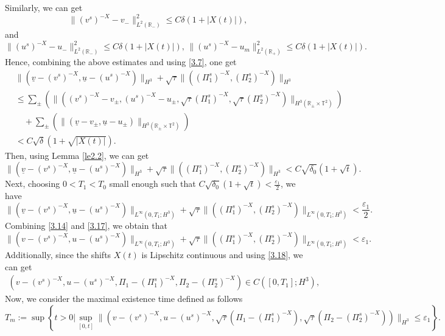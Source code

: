 \documentclass[10pt,reqno]{amsart}
\numberwithin{equation}{section}
\begin{document}
Similarly, we can get
$$
\|(v^s)^{-X}-v_-\|_{L^2(\mathbb{R}_-)}^2\le C\delta(1+|X(t)|),
$$
and
$$
 \|(u^s)^{-X}-u_-\|_{L^2(\mathbb{R}_-)}^2\le C\delta(1+|X(t)|), \, \|(u^s)^{-X}-u_m\|_{L^2(\mathbb{R}_+)}^2\le C\delta(1+|X(t)|).
$$
Hence, combining the above estimates and using \eqref{3.7}, one get
\begin{align*}
&\|(\underline{v}-(v^s)^{-X},\underline{u}-(u^s)^{-X})\|_{H^3}
+\sqrt{\tau}\|((\Pi_1^s)^{-X}, (\Pi_2^s)^{-X})\|_{H^3}\\
&\le
\sum\limits_{\pm}\left(\|((v^s)^{-X}-v_{\pm},(u^s)^{-X}-u_{\pm},
\sqrt{\tau}(\Pi_1^s)^{-X}, \sqrt{\tau}(\Pi_2^s)^{-X})\|_{H^3(\mathbb{R}_{\pm}\times\mathbb{T}^2)}\right)
\\
&\quad+\sum\limits_{\pm}\left(\|(\underline{v}-v_{\pm},\underline{u}-u_{\pm})\|
_{H^3(\mathbb{R}_{\pm}\times\mathbb{T}^2)}\right)\\
&<C\sqrt{\delta}(1+\sqrt{|X(t)|}).
\end{align*}
Then, using Lemma \ref{le2.2}, we can get
\begin{equation}\nonumber
\|(\underline{v}-(v^s)^{-X},\underline{u}-(u^s)^{-X})\|_{H^3}
+\sqrt{\tau}\|((\Pi_1^s)^{-X}, (\Pi_2^s)^{-X})\|_{H^3}
<C\sqrt{\delta_0}(1+\sqrt{t}).
\end{equation}
Next, choosing $0<T_1<T_0$ small enough such that $C\sqrt{\delta_0}(1+\sqrt{t})<\frac{\varepsilon_1}{2}$, we have
\begin{equation}\label{3.17}
\|(\underline{v}-(v^s)^{-X},\underline{u}-(u^s)^{-X})\|_{L^\infty(0, T_1; H^3)}
+\sqrt{\tau}\|((\Pi_1^s)^{-X}, (\Pi_2^s)^{-X})\|_{L^\infty(0, T_1; H^3)}<\frac{\varepsilon_1}{2}.
\end{equation}
Combining \eqref{3.14} and \eqref{3.17}, we obtain that
\begin{equation}\label{3.18}
\|(v-(v^s)^{-X},u-(u^s)^{-X})\|_{L^\infty(0, T_1; H^3)}
+\sqrt{\tau}\|((\Pi_1^s)^{-X}, (\Pi_2^s)^{-X})\|_{L^\infty(0, T_1; H^3)}
<\varepsilon_1.
\end{equation}
Additionally, since the shifts $X(t)$ is Lipschitz continuous and using \eqref{3.18}, we can get
\begin{equation}\nonumber
\begin{aligned}
(v-(v^s)^{-X}, u- (u^s)^{-X}, \Pi_1- (\Pi_1^s)^{-X}, \Pi_2- (\Pi_2^s)^{-X})\in C([0,T_1];H^3),
\end{aligned}
\end{equation}
Now, we consider the maximal existence time defined as follows
\[
T_m:=\sup\left\{t>0\Big|\sup\limits_{[0, t]}
 \|(v-(v^s)^{-X}, u-(u^s)^{-X}, \sqrt{\tau}(\Pi_1-(\Pi^s_1)^{-X}), \sqrt{\tau}(\Pi_2-(\Pi^s_2)^{-X}))\|_{H^3}\le\varepsilon_1\right\}.
\]
\end{document}
